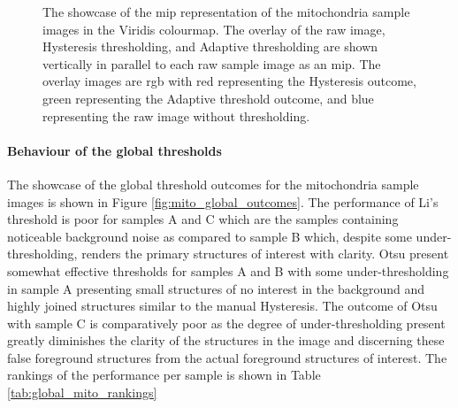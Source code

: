 \begin{figure}[h!]
    \centering
    \caption[Showcase of the MIP of the raw mitochondria sample images with the threshold overlay images vertically in parallel]{The showcase of the \gls{mip} representation of the mitochondria sample images in the Viridis colourmap. The overlay of the raw image, Hysteresis thresholding, and Adaptive thresholding are shown vertically in parallel to each raw sample image as an \gls{mip}. The overlay images are \gls{rgb} with red representing the Hysteresis outcome, green representing the Adaptive threshold outcome, and blue representing the raw image without thresholding.}
    \label{fig:raw_image_overlays_mito}
\end{figure}

\paragraph{Behaviour of the global thresholds}
The showcase of the global threshold outcomes for the mitochondria sample images is shown in Figure \ref{fig:mito_global_outcomes}. The performance of Li's threshold is poor for samples A and C which are the samples containing noticeable background noise as compared to sample B which, despite some under-thresholding, renders the primary structures of interest with clarity. Otsu present somewhat effective thresholds for samples A and B with some under-thresholding in sample A presenting small structures of no interest in the background and highly joined structures similar to the manual Hysteresis. The outcome of Otsu with sample C is comparatively poor as the degree of under-thresholding present greatly diminishes the clarity of the structures in the image and discerning these false foreground structures from the actual foreground structures of interest. The rankings of the performance per sample is shown in Table \ref{tab:global_mito_rankings}

